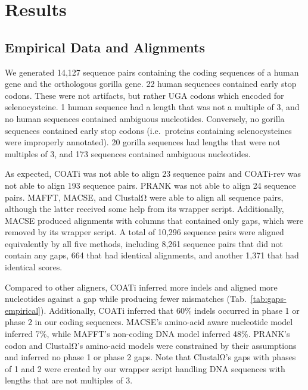 \documentclass[12pt,letterpaper]{article}
\begin{document}
\section*{Results}

\subsection*{Empirical Data and Alignments}

We generated 14,127 sequence pairs containing the coding sequences of a human gene and the orthologous gorilla gene. 22 human sequences contained early stop codons. These were not artifacts, but rather UGA codons which encoded for selenocysteine. 1 human sequence had a length that was not a multiple of 3, and no human sequences contained ambiguous nucleotides. Conversely, no gorilla sequences contained early stop codons (i.e.\ proteins containing selenocysteines were improperly annotated). 20 gorilla sequences had lengths that were not multiples of 3, and 173 sequences contained ambiguous nucleotides.

As expected, COATi was not able to align 23 sequence pairs and COATi-rev was not able to align 193 sequence pairs. PRANK was not able to align 24 sequence pairs. MAFFT, MACSE, and ClustalΩ were able to align all sequence pairs, although the latter received some help from its wrapper script. Additionally, MACSE produced alignments with columns that contained only gaps, which were removed by its wrapper script.
A total of 10,296 sequence pairs were aligned equivalently by all five methods, including 8,261 sequence pairs that did not contain any gaps, 664 that had identical alignments, and another 1,371 that had identical scores.

Compared to other aligners, COATi inferred more indels and aligned more nucleotides against a gap while producing fewer mismatches (Tab.~\ref{tab:gaps-empirical}). Additionally, COATi inferred that 60\% indels occurred in phase 1 or phase 2 in our coding sequences. MACSE's amino-acid aware nucleotide model inferred 7\%, while MAFFT's non-coding DNA model inferred 48\%. PRANK's codon and ClustalΩ's amino-acid models were constrained by their assumptions and inferred no phase 1 or phase 2 gaps. Note that ClustalΩ's gaps with phases of 1 and 2 were created by our wrapper script handling DNA sequences with lengths that are not multiples of 3.  
\end{document}
